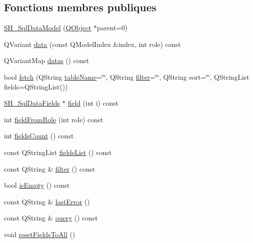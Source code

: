 \subsection*{Fonctions membres publiques}
\begin{DoxyCompactItemize}
\item 
\hyperlink{classSH__SqlDataModel_a946716dc9b74e3ec4a70778319ceb3f8}{S\-H\-\_\-\-Sql\-Data\-Model} (\hyperlink{classQObject}{Q\-Object} $\ast$parent=0)
\item 
Q\-Variant \hyperlink{classSH__SqlDataModel_aa4664329d52c2d2cba2bacc42fa1a564}{data} (const Q\-Model\-Index \&index, int role) const 
\item 
Q\-Variant\-Map \hyperlink{classSH__SqlDataModel_a24db284b370930b57e2261a7a72e2da8}{datas} () const 
\item 
bool \hyperlink{classSH__SqlDataModel_ab6c206088250a66ddc8cb8d33a38e421}{fetch} (Q\-String \hyperlink{classSH__SqlDataModel_afced07f7b9e6fecd349a5428a1a4615e}{table\-Name}=\char`\"{}\char`\"{}, Q\-String \hyperlink{classSH__SqlDataModel_a1f3b35273198f9c67ca4bca5b29876e9}{filter}=\char`\"{}\char`\"{}, Q\-String sort=\char`\"{}\char`\"{}, Q\-String\-List fields=Q\-String\-List())
\item 
\hyperlink{classSH__SqlDataFields}{S\-H\-\_\-\-Sql\-Data\-Fields} $\ast$ \hyperlink{classSH__SqlDataModel_a92c51d5c1f6aca08a7ee566ece1e4cb6}{field} (int i) const 
\item 
int \hyperlink{classSH__SqlDataModel_a3c6539114dd06aa8043e7a4e9762f6f4}{field\-From\-Role} (int role) const 
\item 
int \hyperlink{classSH__SqlDataModel_a46f0951fd358e30892a982ebd34e43c2}{fields\-Count} () const 
\item 
const Q\-String\-List \hyperlink{classSH__SqlDataModel_a571bdc1f9592bd13f98fd748563d46c0}{fields\-List} () const 
\item 
const Q\-String \& \hyperlink{classSH__SqlDataModel_aa86018df823c85798574ec8d63413c1a}{filter} () const 
\item 
bool \hyperlink{classSH__SqlDataModel_ad85bfde0f7ffb06172eb5543e26d1331}{is\-Empty} () const 
\item 
const Q\-String \& \hyperlink{classSH__SqlDataModel_ade915650ffbdb8d026e00893d1f5a195}{last\-Error} ()
\item 
const Q\-String \& \hyperlink{classSH__SqlDataModel_aee909d0a29715d02d920fcf854bfbba2}{query} () const 
\item 
void \hyperlink{classSH__SqlDataModel_ad0477d16e78ba808250e2054952f9833}{reset\-Fields\-To\-All} ()

\end{DoxyCompactItemize}
